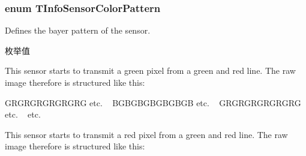 \hypertarget{group___device_specific_interface_ga3a851956283d4fe464e3e9e2e1c85734}{
\subsubsection[{T\+Info\+Sensor\+Color\+Pattern}]{\setlength{\rightskip}{0pt plus 5cm}enum {\bf T\+Info\+Sensor\+Color\+Pattern}}}\label{group___device_specific_interface_ga3a851956283d4fe464e3e9e2e1c85734}


Defines the bayer pattern of the sensor. 

\begin{Desc}
\item[枚举值]\par
\begin{description}
\item[{\em 
\hypertarget{group___device_specific_interface_gga3a851956283d4fe464e3e9e2e1c85734a37ceda728c34125268affc1d0ee06a6e}{iscp\+Green\+Red}\label{group___device_specific_interface_gga3a851956283d4fe464e3e9e2e1c85734a37ceda728c34125268affc1d0ee06a6e}
}]This sensor starts to transmit a green pixel from a green and red line. The raw image therefore is structured like this\+:

G\+R\+G\+R\+G\+R\+G\+R\+G\+R\+G\+R\+G etc. ~\newline
B\+G\+B\+G\+B\+G\+B\+G\+B\+G\+B\+G\+B etc. ~\newline
G\+R\+G\+R\+G\+R\+G\+R\+G\+R\+G\+R\+G etc. ~\newline
etc. ~\newline
{}\item[{\em 
\hypertarget{group___device_specific_interface_gga3a851956283d4fe464e3e9e2e1c85734a31faed3c2a05ec15aa93a3265e1447ba}{iscp\+Red\+Green}\label{group___device_specific_interface_gga3a851956283d4fe464e3e9e2e1c85734a31faed3c2a05ec15aa93a3265e1447ba}
}]This sensor starts to transmit a red pixel from a green and red line. The raw image therefore is structured like this\+:


\end{description}
\end{Desc}
